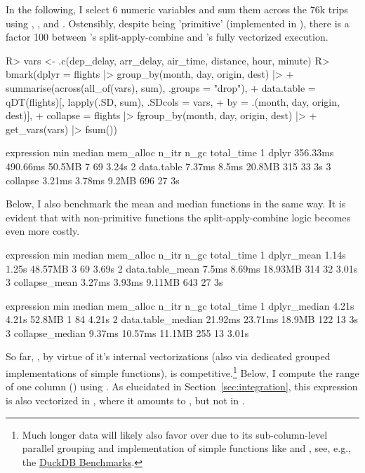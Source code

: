 \documentclass[article]{jss} %
\newcommand{\fct}[1]{\code{#1()}}
\begin{document}
%
In the following, I select 6 numeric variables and sum them across the 76k trips using , , and . Ostensibly, despite \fct{sum} being 'primitive' (implemented in ), there is a factor 100 between 's split-apply-combine and 's fully vectorized execution.
%
\begin{Schunk}
\begin{Sinput}
R> vars <- .c(dep_delay, arr_delay, air_time, distance, hour, minute)
R> bmark(dplyr = flights |> group_by(month, day, origin, dest) |>
+                  summarise(across(all_of(vars), sum), .groups = "drop"),
+        data.table = qDT(flights)[, lapply(.SD, sum), .SDcols = vars,
+                                  by = .(month, day, origin, dest)],
+        collapse = flights |> fgroup_by(month, day, origin, dest) |>
+                     get_vars(vars) |> fsum())
\end{Sinput}
\begin{Soutput}
  expression      min   median mem_alloc n_itr n_gc total_time
1      dplyr 356.33ms 490.66ms    50.5MB     7   69      3.24s
2 data.table   7.37ms    8.5ms    20.8MB   315   33         3s
3   collapse   3.21ms   3.78ms     9.2MB   696   27         3s
\end{Soutput}
\end{Schunk}
%
Below, I also benchmark the mean and median functions in the same way. It is evident that with non-primitive  functions the split-apply-combine logic becomes even more costly.
%
\begin{Schunk}
\begin{Soutput}
       expression    min median mem_alloc n_itr n_gc total_time
1      dplyr_mean  1.14s  1.25s   48.57MB     3   69      3.69s
2 data.table_mean  7.5ms 8.69ms   18.93MB   314   32      3.01s
3   collapse_mean 3.27ms 3.93ms    9.11MB   643   27         3s
\end{Soutput}
\begin{Soutput}
         expression     min  median mem_alloc n_itr n_gc total_time
1      dplyr_median   4.21s   4.21s    52.8MB     1   84      4.21s
2 data.table_median 21.92ms 23.71ms    18.9MB   122   13         3s
3   collapse_median  9.37ms 10.57ms    11.1MB   255   13      3.01s
\end{Soutput}
\end{Schunk}
%
So far, , by virtue of it's internal vectorizations (also via dedicated grouped  implementations of simple functions), is competitive.\footnote{Much longer data will likely also favor  over  due to its sub-column-level parallel grouping and implementation of simple functions like \fct{sum} and \fct{mean}, see, e.g., the \href{https://duckdblabs.github.io/db-benchmark/}{DuckDB Benchmarks}.} Below, I compute the range of one column () using . As elucidated in Section~\ref{sec:integration}, this expression is also vectorized in , where it amounts to , but not in .
\end{document}
